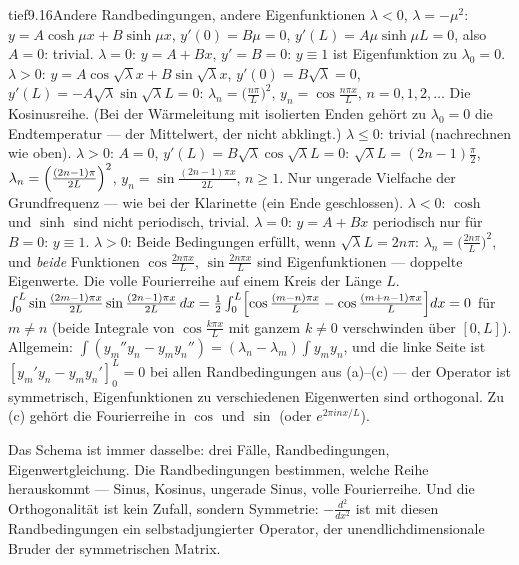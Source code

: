 \begin{loesungkarte}{tief}{9.16}{Andere Randbedingungen, andere Eigenfunktionen}
$\lambda < 0$, $\lambda = -\mu^{2}$: $y = A\cosh\mu x + B\sinh\mu x$, $y'(0) = B\mu = 0$, $y'(L) = A\mu\sinh\mu L = 0$, also $A = 0$: trivial. $\lambda = 0$: $y = A + Bx$, $y' = B = 0$: $y\equiv1$ ist Eigenfunktion zu $\lambda_0 = 0$. $\lambda > 0$: $y = A\cos\sqrt\lambda x + B\sin\sqrt\lambda x$, $y'(0) = B\sqrt\lambda = 0$, $y'(L) = -A\sqrt\lambda\sin\sqrt\lambda L = 0$: $\lambda_n = \bigl(\frac{n\pi}L\bigr)^{2}$, $y_n = \cos\frac{n\pi x}L$, $n = 0, 1, 2, \dots$ Die Kosinusreihe. (Bei der Wärmeleitung mit isolierten Enden gehört zu $\lambda_0 = 0$ die Endtemperatur --- der Mittelwert, der nicht abklingt.)
$\lambda\le0$: trivial (nachrechnen wie oben). $\lambda > 0$: $A = 0$, $y'(L) = B\sqrt\lambda\cos\sqrt\lambda L = 0$: $\sqrt\lambda L = (2n - 1)\frac\pi2$, $\lambda_n = \Bigl(\frac{(2n - 1)\pi}{2L}\Bigr)^{2}$, $y_n = \sin\frac{(2n - 1)\pi x}{2L}$, $n\ge1$. Nur ungerade Vielfache der Grundfrequenz --- wie bei der Klarinette (ein Ende geschlossen).
$\lambda < 0$: $\cosh$ und $\sinh$ sind nicht periodisch, trivial. $\lambda = 0$: $y = A + Bx$ periodisch nur für $B = 0$: $y\equiv1$. $\lambda > 0$: Beide Bedingungen erfüllt, wenn $\sqrt\lambda L = 2n\pi$: $\lambda_n = \bigl(\frac{2n\pi}L\bigr)^{2}$, und \emph{beide} Funktionen $\cos\frac{2n\pi x}L$, $\sin\frac{2n\pi x}L$ sind Eigenfunktionen --- doppelte Eigenwerte. Die volle Fourierreihe auf einem Kreis der Länge $L$.
$\int_0^{L}\sin\frac{(2m - 1)\pi x}{2L}\sin\frac{(2n - 1)\pi x}{2L}\,dx = \frac12\int_0^{L}\Bigl[\cos\frac{(m - n)\pi x}L - \cos\frac{(m + n - 1)\pi x}L\Bigr]dx = 0$ für $m\neq n$ (beide Integrale von $\cos\frac{k\pi x}L$ mit ganzem $k\neq0$ verschwinden über $[0, L]$). Allgemein: $\int(y_m''y_n - y_my_n'') = (\lambda_n - \lambda_m)\int y_my_n$, und die linke Seite ist $[y_m'y_n - y_my_n']_0^{L} = 0$ bei allen Randbedingungen aus (a)--(c) --- der Operator ist symmetrisch, Eigenfunktionen zu verschiedenen Eigenwerten sind orthogonal. Zu (c) gehört die Fourierreihe in $\cos$ und $\sin$ (oder $e^{2\pi inx/L}$).
\begin{mitnehmen}\kastentext
Das Schema ist immer dasselbe: drei Fälle, Randbedingungen, Eigenwertgleichung. Die Randbedingungen bestimmen, welche Reihe herauskommt --- Sinus, Kosinus, ungerade Sinus, volle Fourierreihe. Und die Orthogonalität ist kein Zufall, sondern Symmetrie: $-\frac{d^{2}}{dx^{2}}$ ist mit diesen Randbedingungen ein selbstadjungierter Operator, der unendlichdimensionale Bruder der symmetrischen Matrix.
\end{mitnehmen}
\end{loesungkarte}

